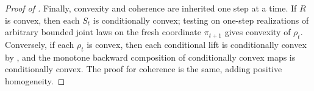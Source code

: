 \documentclass[a4paper]{amsart}
\newtheorem{lemma}[lemma]{Lemma}
\theoremstyle{definition}
\newcommand{\R}{\mathbb{R}}
\newcommand{\F}{\mathcal{F}}
\newcommand{\G}{\mathcal{G}}
\newcommand{\cH}{\mathcal{H}}
\newcommand{\law}{\mathcal{L}}
\newcommand{\Pc}{\mathcal P}
\begin{document}
\begin{proof}[Proof of ]
Finally, convexity and coherence are inherited one step at a time. If \(R\) is
convex, then each \(S_t\) is conditionally convex; testing on one-step
realizations of arbitrary bounded joint laws on the fresh coordinate
\(\pi_{t+1}\) gives convexity of \(\rho_t\). Conversely, if each \(\rho_t\) is
convex, then each conditional lift is conditionally convex by
, and the monotone backward composition of
conditionally convex maps is conditionally convex. The proof for coherence is
the same, adding positive homogeneity.
\end{proof}
















\end{document}
